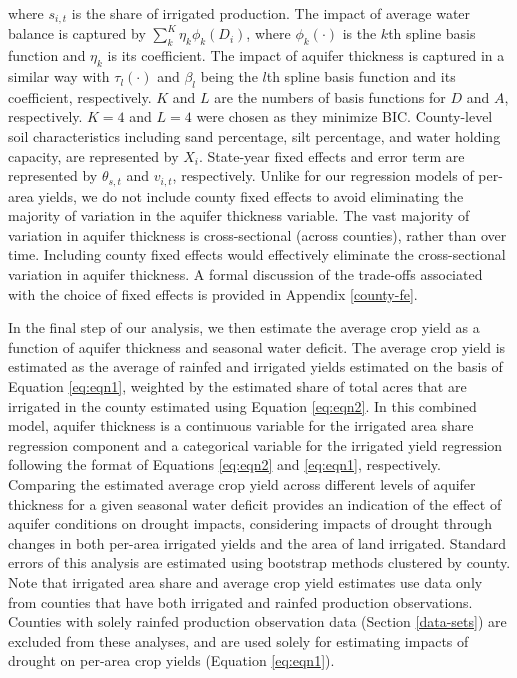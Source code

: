 \documentclass[
]{article}
\begin{document}
where \(s_{i,t}\) is the share of irrigated production. The impact of average water balance is captured by \(\sum_{k}^K \eta_{k}\phi_{k}(D_{i})\), where \(\phi_{k}(\cdot)\) is the \(k\)th spline basis function and \(\eta_{k}\) is its coefficient. The impact of aquifer thickness is captured in a similar way with \(\tau_{l}(\cdot)\) and \(\beta_{l}\) being the \(l\)th spline basis function and its coefficient, respectively. $K$ and $L$ are the numbers of basis functions for $D$ and $A$, respectively. $K = 4$ and $L = 4$ were chosen as they minimize BIC. County-level soil characteristics including sand percentage, silt percentage, and water holding capacity, are represented by \(X_i\). State-year fixed effects and error term are represented by \(\theta_{s,t}\) and \(v_{i,t}\), respectively. Unlike for our regression models of per-area yields, we do not include county fixed effects to avoid eliminating the majority of variation in the aquifer thickness variable. The vast majority of variation in aquifer thickness is cross-sectional (across counties), rather than over time. Including county fixed effects would effectively eliminate the cross-sectional variation in aquifer thickness. A formal discussion of the trade-offs associated with the choice of fixed effects is provided in Appendix \ref{county-fe}.

In the final step of our analysis, we then estimate the average crop yield as a function of aquifer thickness and seasonal water deficit. The average crop yield is estimated as the average of rainfed and irrigated yields estimated on the basis of Equation \eqref{eq:eqn1}, weighted by the estimated share of total acres that are irrigated in the county estimated using Equation \eqref{eq:eqn2}. In this combined model, aquifer thickness is a continuous variable for the irrigated area share regression component and a categorical variable for the irrigated yield regression following the format of Equations \eqref{eq:eqn2} and \eqref{eq:eqn1}, respectively. Comparing the estimated average crop yield across different levels of aquifer thickness for a given seasonal water deficit provides an indication of the effect of aquifer conditions on drought impacts, considering impacts of drought through changes in both per-area irrigated yields and the area of land irrigated. Standard errors of this analysis are estimated using bootstrap methods clustered by county. Note that irrigated area share and average crop yield estimates use  data only from counties that have both irrigated and rainfed production observations. Counties with solely rainfed production observation data (Section \ref{data-sets}) are excluded from these analyses, and are used solely for estimating impacts of drought on per-area crop yields (Equation \ref{eq:eqn1}).
\end{document}
